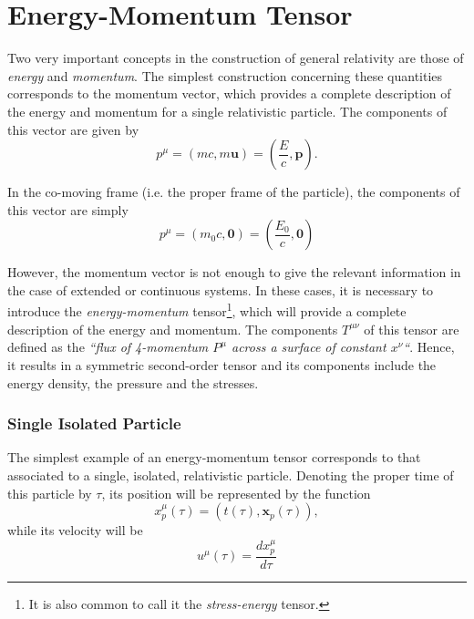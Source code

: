 \section{Energy-Momentum Tensor}

Two very important concepts in the construction of general relativity are those of \textit{energy} and \textit{momentum}. The simplest construction concerning these quantities corresponds to the momentum vector, which provides a complete description of the energy and momentum for a single relativistic particle. The components of this vector are given by
\begin{equation}
p^\mu = \left( mc, m \textbf{u}  \right)= \left( \frac{E}{c}, \textbf{p}  \right).
 \end{equation} 

In the co-moving frame (i.e. the proper frame of the particle), the components of this vector are simply
\begin{equation}
p^\mu = \left( m_0 c, \textbf{0}  \right) = \left( \frac{E_0}{c}, \textbf{0}  \right)
\end{equation}

However, the momentum vector is not enough to give the relevant information in the case of  extended or continuous systems. In these cases, it is necessary to introduce the \textit{energy-momentum} tensor\footnote{It is also common to call it the \textit{stress-energy} tensor.}, which will provide a complete description of the energy and momentum. The components $T^{\mu \nu}$ of this tensor are defined as the \textit{``flux of 4-momentum $P^{\mu}$ across a surface of constant $x^{\nu}$``}. Hence, it results in a symmetric second-order tensor and its components include the energy density, the pressure and the stresses.


\subsubsection{Single Isolated Particle}
The simplest example of an energy-momentum tensor corresponds to that associated to a single, isolated, relativistic particle. Denoting the proper time of this particle by $\tau$, its position will be represented by the function
\begin{equation}
x_{p}^{\mu}\left(\tau\right)=\left(t\left(\tau\right),\textbf{x}_{p}\left(\tau\right)\right),
\end{equation}
while its velocity will be
\begin{equation}
u^{\mu}\left(\tau\right) = \frac{d{x}^\mu_{p}}{d\tau} 
\end{equation}

